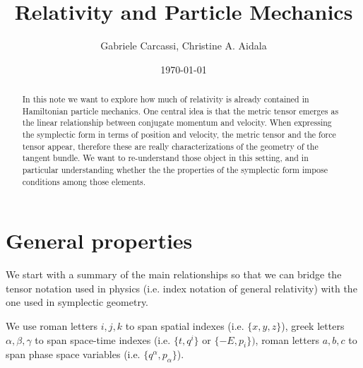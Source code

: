 \documentclass[11pt]{article}
\begin{document}
\title{Relativity and Particle  Mechanics}
\author{Gabriele Carcassi, Christine A. Aidala}

\date{\today}

\maketitle

\begin{abstract}
	In this note we want to explore how much of relativity is already contained in Hamiltonian particle mechanics. One central idea is that the metric tensor emerges as the linear relationship between conjugate momentum and velocity. When expressing the symplectic form in terms of position and velocity, the metric tensor and the force tensor appear, therefore these are really characterizations of the geometry of the tangent bundle. We want to re-understand those object in this setting, and in particular understanding whether the the properties of the symplectic form impose conditions among those elements.
\end{abstract}

\section{General properties}
We start with a summary of the main relationships so that we can bridge the tensor notation used in physics (i.e. index notation of general relativity) with the one used in symplectic geometry.

We use roman letters $i,j,k$ to span spatial indexes (i.e. $\{x,y,z\}$), greek letters $\alpha, \beta, \gamma$ to span space-time indexes (i.e. $\{t, q^i\}$ or $\{-E, p_i\})$, roman letters $a,b,c$ to span phase space variables (i.e. $\{q^\alpha, p_\alpha\}$).
\end{document}
